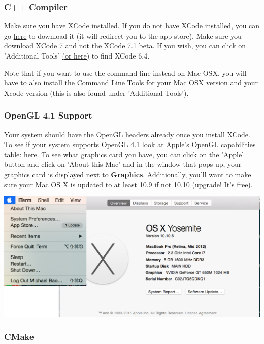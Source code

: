 \documentclass{article}
\begin{document}
\subsubsection*{C++ Compiler}

Make sure you have XCode installed. If you do not have XCode installed, you can go \href{https://developer.apple.com/xcode/download/}{here} to download it (it will redirect you to the app store). Make sure you download XCode 7 and not the XCode 7.1 beta. If you wish, you can click on 'Additional Tools' \href{https://developer.apple.com/downloads/}{(or here)} to find XCode 6.4.

Note that if you want to use the command line instead on Mac OSX, you will have to also install the Command Line Tools for your Mac OSX version and your Xcode version (this is also found under 'Additional Tools').

\subsubsection*{OpenGL 4.1 Support}

Your system should have the OpenGL headers already once you install XCode. To see if your system supports OpenGL 4.1 look at Apple's OpenGL capabilities table: \href{https://developer.apple.com/opengl/capabilities/}{here}. To see what graphics card you have, you can click on the 'Apple' button and click on 'About this Mac' and in the window that pops up, your graphics card is displayed next to \textbf{Graphics}. Additionally, you'll want to make sure your Mac OS X is updated to at least 10.9 if not 10.10 (upgrade! It's free).

\includegraphics[width=\linewidth]{osx1.png}

\subsubsection*{CMake}
\end{document}

